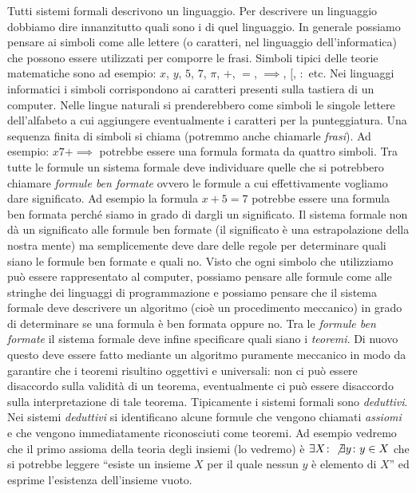 Tutti sistemi formali descrivono un linguaggio.
Per descrivere un linguaggio dobbiamo dire innanzitutto quali sono i 
di quel linguaggio. In generale possiamo pensare ai simboli come alle lettere 
(o caratteri, nel linguaggio dell'informatica) che possono essere utilizzati per comporre le frasi.
Simboli tipici delle teorie matematiche sono ad esempio: $x$, $y$, $5$, $7$, $\pi$, $+$, $=$, $\implies$, $[$, $\colon$ etc.
Nei linguaggi informatici i simboli corrispondono ai caratteri presenti sulla tastiera 
di un computer. 
Nelle lingue naturali si prenderebbero come simboli le singole lettere dell'alfabeto
a cui aggiungere eventualmente i caratteri per la punteggiatura.
Una sequenza finita di simboli si chiama  (potremmo anche chiamarle \emph{frasi}).
Ad esempio: $x7+\implies$ potrebbe essere una formula formata da quattro simboli.
Tra tutte le formule un sistema formale deve individuare quelle che si potrebbero chiamare 
\emph{formule ben formate} ovvero le formule a cui effettivamente vogliamo dare significato.
Ad esempio la formula $x+5=7$ potrebbe essere una formula ben formata perché siamo in grado 
di dargli un significato.
Il sistema formale non dà un significato alle formule ben formate 
(il significato è una estrapolazione della nostra mente) ma semplicemente deve dare delle regole 
per determinare quali siano le formule ben formate e quali no.
Visto che ogni simbolo che utilizziamo può essere rappresentato al computer, possiamo pensare 
alle formule come alle stringhe dei linguaggi di programmazione e possiamo pensare che il sistema formale 
deve descrivere un algoritmo (cioè un procedimento meccanico) in grado di determinare 
se una formula è ben formata oppure no.
Tra le \emph{formule ben formate} il sistema formale deve infine specificare quali 
siano i \emph{teoremi}. 
Di nuovo questo deve essere fatto mediante un algoritmo puramente meccanico 
in modo da garantire che i teoremi risultino oggettivi e universali: 
non ci può essere disaccordo sulla validità di un teorema, eventualmente 
ci può essere disaccordo 
sulla interpretazione di tale teorema.
Tipicamente i sistemi formali sono \emph{deduttivi}.
Nei sistemi \emph{deduttivi} si identificano alcune formule che vengono 
chiamati \emph{assiomi} e che vengono immediatamente riconosciuti come teoremi.
Ad esempio vedremo che il primo assioma della teoria degli insiemi (lo vedremo) è 
$\exists X\colon \not \exists y\colon y\in X$ 
che si potrebbe leggere ``esiste un insieme $X$ per il quale nessun $y$ è elemento di $X$''
ed esprime l'esistenza dell'insieme vuoto.
